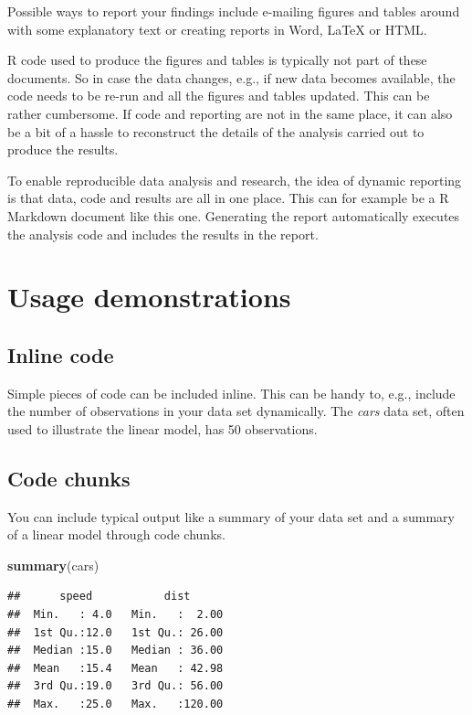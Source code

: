 \documentclass[]{book}
\newenvironment{Shaded}{\begin{snugshade}}{\end{snugshade}}
\newcommand{\KeywordTok}[1]{\textcolor[rgb]{0.13,0.29,0.53}{\textbf{#1}}}
\newcommand{\NormalTok}[1]{#1}
\begin{document}
Possible ways to report your findings include e-mailing figures and tables around with some explanatory text or creating reports in Word, LaTeX or HTML.

R code used to produce the figures and tables is typically not part of these documents. So in case the data changes, e.g., if new data becomes available, the code needs to be re-run and all the figures and tables updated. This can be rather cumbersome. If code and reporting are not in the same place, it can also be a bit of a hassle to reconstruct the details of the analysis carried out to produce the results.

To enable reproducible data analysis and research, the idea of dynamic reporting is that data, code and results are all in one place. This can for example be a R Markdown document like this one. Generating the report automatically executes the analysis code and includes the results in the report.

\hypertarget{usage-demonstrations}{%
\section{Usage demonstrations}\label{usage-demonstrations}}

\hypertarget{inline-code}{%
\subsection{Inline code}\label{inline-code}}

Simple pieces of code can be included inline. This can be handy to, e.g., include the number of observations in your data set dynamically. The \emph{cars} data set, often used to illustrate the linear model, has 50 observations.

\hypertarget{code-chunks}{%
\subsection{Code chunks}\label{code-chunks}}

You can include typical output like a summary of your data set and a summary of a linear model through code chunks.

\begin{Shaded}
\begin{Highlighting}[]
\KeywordTok{summary}\NormalTok{(cars)}
\end{Highlighting}
\end{Shaded}

\begin{verbatim}
##      speed           dist       
##  Min.   : 4.0   Min.   :  2.00  
##  1st Qu.:12.0   1st Qu.: 26.00  
##  Median :15.0   Median : 36.00  
##  Mean   :15.4   Mean   : 42.98  
##  3rd Qu.:19.0   3rd Qu.: 56.00  
##  Max.   :25.0   Max.   :120.00
\end{verbatim}
\end{document}
